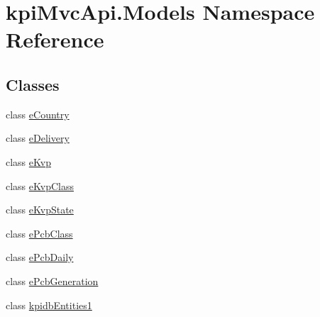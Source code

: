 \hypertarget{namespacekpi_mvc_api_1_1_models}{}\section{kpi\+Mvc\+Api.\+Models Namespace Reference}
\label{namespacekpi_mvc_api_1_1_models}
\subsection*{Classes}
\begin{DoxyCompactItemize}
\item 
class \hyperlink{classkpi_mvc_api_1_1_models_1_1e_country}{e\+Country}
\item 
class \hyperlink{classkpi_mvc_api_1_1_models_1_1e_delivery}{e\+Delivery}
\item 
class \hyperlink{classkpi_mvc_api_1_1_models_1_1e_kvp}{e\+Kvp}
\item 
class \hyperlink{classkpi_mvc_api_1_1_models_1_1e_kvp_class}{e\+Kvp\+Class}
\item 
class \hyperlink{classkpi_mvc_api_1_1_models_1_1e_kvp_state}{e\+Kvp\+State}
\item 
class \hyperlink{classkpi_mvc_api_1_1_models_1_1e_pcb_class}{e\+Pcb\+Class}
\item 
class \hyperlink{classkpi_mvc_api_1_1_models_1_1e_pcb_daily}{e\+Pcb\+Daily}
\item 
class \hyperlink{classkpi_mvc_api_1_1_models_1_1e_pcb_generation}{e\+Pcb\+Generation}
\item 
class \hyperlink{classkpi_mvc_api_1_1_models_1_1kpidb_entities1}{kpidb\+Entities1}
\end{DoxyCompactItemize}

